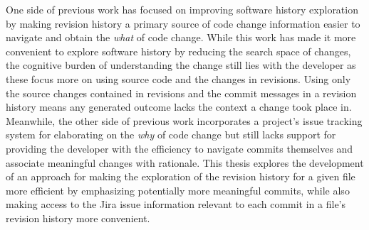 
One side of previous work has focused on improving software history exploration by making revision history a primary source of code change information easier to navigate and obtain the \emph{what} of code change.
While this work has made it more convenient to explore software history by reducing the search space of changes, the cognitive burden of understanding the change still lies with the developer as these focus more on using source code and the changes in revisions.
Using only the source changes contained in revisions and the commit messages in a revision history means any generated outcome lacks the context a change took place in.
Meanwhile, the other side of previous work incorporates a project's issue tracking system for elaborating on the \emph{why} of code change but still lacks support for providing the developer with the efficiency to navigate commits themselves and associate meaningful changes with rationale.
This thesis explores the development of an approach for making the exploration of the revision history for a given file more efficient by emphasizing potentially more meaningful commits, while also making access to the Jira issue information relevant to each commit in a file's revision history more convenient.

\endinput

Any text after an \endinput is ignored.
You could put scraps here or things in progress.